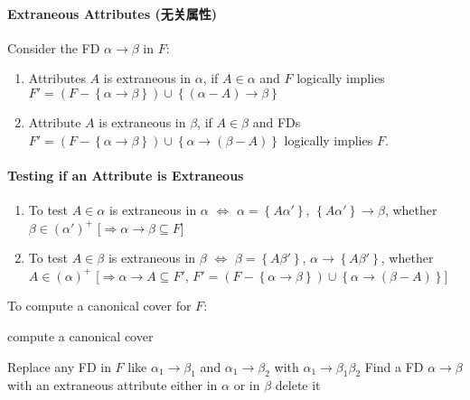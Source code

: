 \paragraph{Extraneous Attributes (无关属性)}
Consider the FD $\alpha \rightarrow \beta$ in $F$:
\begin{enumerate}\small
    \item Attributes $A$ is extraneous in $\alpha$, if $A\in \alpha$ and $F$ logically implies $F'=(F-\left\{ \alpha\rightarrow \beta \right\})\cup \left\{ (\alpha-A)\rightarrow \beta\right\}$
    \item Attribute $A$ is extraneous in $\beta$, if $A\in \beta$ and FDs $F'=(F-\left\{ \alpha \rightarrow \beta \right\})\cup \left\{ \alpha \rightarrow (\beta - A) \right\}$ logically implies $F$. 
\end{enumerate}

\paragraph{Testing if an Attribute is Extraneous}
\begin{enumerate}\small
    \item To test $A\in \alpha$ is extraneous in $\alpha$ $\Leftrightarrow$ $\alpha=\left\{ A\alpha' \right\}$, $\left\{ A\alpha' \right\}\rightarrow \beta$, whether $\beta \in (\alpha')^+$ [$\Rightarrow \alpha\rightarrow \beta \subseteq F$]
    \item To test $A \in \beta$ is extraneous in $\beta$ $\Leftrightarrow$ $\beta=\left\{ A\beta' \right\}$, $\alpha \rightarrow \left\{ A\beta' \right\}$, whether $A\in (\alpha)^+$ [$\Rightarrow \alpha \rightarrow A \subseteq F'$, $F'=(F-\left\{ \alpha \rightarrow \beta \right\})\cup \left\{ \alpha \rightarrow (\beta - A) \right\}$]
\end{enumerate}

To compute a canonical cover for $F$:
\begin{algorithm}[H]
    \caption{compute a canonical cover}
    \begin{algorithmic}
        \Repeat
            \State Replace any FD in $F$ like $\alpha_1 \rightarrow \beta_1$ and $\alpha_1 \rightarrow \beta_2$ with $\alpha_1 \rightarrow \beta_1\beta_2$
            \State Find a FD $\alpha \rightarrow \beta$ with an extraneous attribute either in $\alpha$ or in $\beta$
                delete it 
            \EndIf
    \end{algorithmic}
\end{algorithm}

